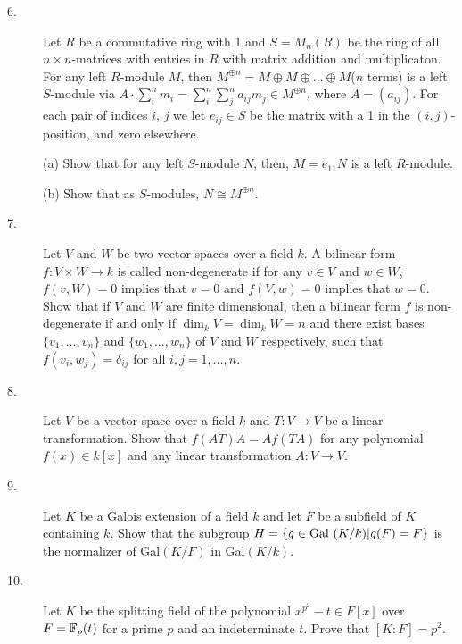 \documentclass{article}
\begin{document}
\begin{description}
\item[6.]
Let $R$ be a commutative ring with 1 and $S = M_n(R)$ be the ring of all
$n \times n$-matrices with entries in $R$ with matrix addition and
multiplicaton. For any left $R$-module $M$, then
$M^{\oplus n}= M \oplus M \oplus \dots \oplus M$($n$ terms) is a left
$S$-module via $A \cdot \sum^n_i m_i= \sum^n_i \sum^n_j a_{ij}m_j
  \in M^{\oplus n}$,
where $A = (a_{ij})$. For each pair of indices $i$, $j$ we let
$e_{ij} \in S$ be the matrix with a 1 in the $(i,j)$-position, and
zero elsewhere.

\item[\quad] (a)
Show that for any left $S$-module $N$, then, $M=e_{11}N$ is a left $R$-module.

\item[\quad] (b)
Show that as $S$-modules, $N \cong M^{\oplus n}$.

\item[7.]
Let $V$ and $W$ be two vector spaces over a field $k$. A bilinear form
$f : V \times W \to k$ is called non-degenerate if for any $v \in V$
and $w \in W$, $f(v,W)=0$ implies that $v=0$ and $f(V,w)=0$ implies that
$w=0$. Show that if $V$ and $W$ are finite dimensional, then a bilinear
form $f$ is non-degenerate if and only if $\dim_k V= \dim_k W=n$ and there
exist bases $\{v_1, \dots, v_n\}$ and $\{w_1, \dots, w_n\}$ of $V$ and
$W$ respectively, such that $f(v_i, w_j) = \delta_{ij}$
for all $i, j = 1, \dots, n$.

\item[8.]
Let $V$ be a vector space over a field $k$ and $T : V \to V$ be a linear
transformation. Show that $f(AT)A=Af(TA)$ for any polynomial
$f(x) \in k[x]$ and any linear transformation $A: V \to V$.

\item[9.]
Let $K$ be a Galois extension of a field $k$ and let $F$ be a subfield of $K$
containing $k$. Show that the subgroup $H=\{g \in \hbox{Gal\ }(K/k) |g(F)=F\}$
is the normalizer of Gal$(K/F)$ in Gal$(K/k)$.

\item[10.]
Let $K$ be the splitting field of the polynomial $x^{p^2} - t \in F[x]$ over
$F = \Bbb F_p (t)$ for a prime $p$ and an indeterminate $t$. Prove that
$[K:F] = p^2$.





\end{description}    
\end{document}
